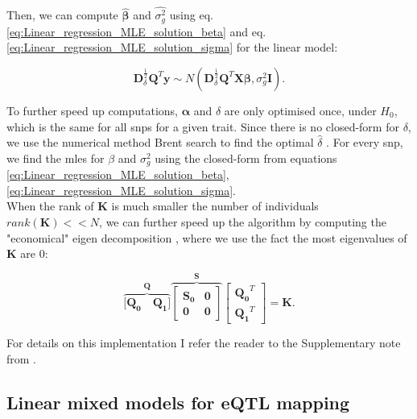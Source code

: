 Then, we can compute $\hat{\boldsymbol{\beta}}$ and $\hat{\sigma_g^2}$ using eq. \eqref{eq:Linear_regression_MLE_solution_beta} and eq. \eqref{eq:Linear_regression_MLE_solution_sigma} for the linear model:

\begin{equation}
    \mathbf{D}^{\frac{1}{2}}_{\delta}\mathbf{Q}^{T}\mathbf{y} \sim N(\mathbf{D}^{\frac{1}{2}}_{\delta}\mathbf{Q}^{T}\mathbf{X}\boldsymbol{\beta}, \sigma_g^2\mathbf{I}).
\end{equation}


To further speed up computations, $\boldsymbol{\alpha}$ and $\delta$ are only optimised once, under $H_0$, which is the same for all \gls{snp}s for a given trait.
Since there is no closed-form for $\delta$, we use the numerical method Brent search to find the optimal $\hat{\delta}$ \cite{goddard2009estimating}.
For every \gls{snp}, we find the \gls{mle}s for $\beta$ and $\sigma^2_g$ using the closed-form from equations \eqref{eq:Linear_regression_MLE_solution_beta},\eqref{eq:Linear_regression_MLE_solution_sigma}.\\

When the rank of $\mathbf{K}$ is much smaller the number of individuals $rank(\mathbf{K}) << N$,  we can further speed up the algorithm by computing the "economical" eigen decomposition \cite{lippert2011fast}, where we use the fact the most eigenvalues of $\mathbf{K}$ are 0:

\begin{equation}\label{eq:economic_eigen_decomposition}
    \overbrace{[\mathbf{Q_0} \quad \mathbf{Q_1]}}^{\mathbf{Q}}
            \overbrace{\left[\begin{array}{cc}
                \mathbf{S_0} & \mathbf{0}\\
                        \mathbf{0} & \mathbf{0}
            \end{array}\right]}^{\mathbf{S}}
        \left[\begin{array}{c}
            \mathbf{Q_0}^T \\
            \mathbf{Q_1}^T
        \end{array}\right] = \mathbf{K}.
\end{equation}

For details on this implementation I refer the reader to the Supplementary note from \cite{lippert2011fast}.


\subsection{Linear mixed models for eQTL mapping}

